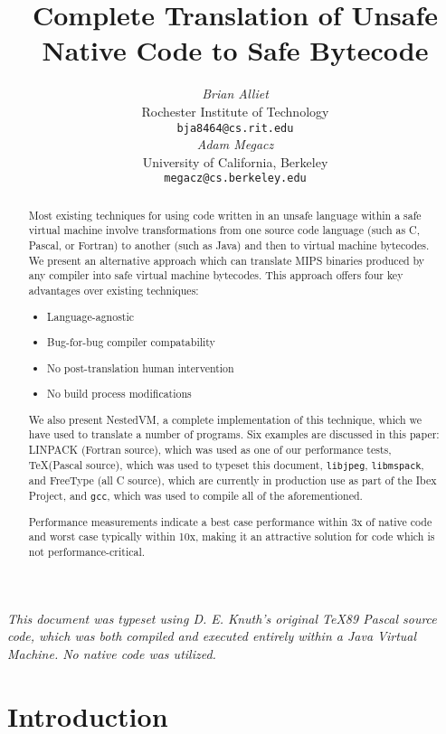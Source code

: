 \documentclass{acmconf}
\title{\textbf{\textsf{
Complete Translation of Unsafe Native Code to Safe Bytecode
}}}
\date{}
\author{\begin{tabular}{@{}c@{}}
        {\em {Brian Alliet}} \\
        {Rochester Institute of Technology}\\
        {\tt bja8464@cs.rit.edu}
   \end{tabular}\hskip 1in\begin{tabular}{@{}c@{}}
        {\em {Adam Megacz}} \\
        {University of California, Berkeley} \\
        {\tt megacz@cs.berkeley.edu}
\end{tabular}}
\begin{document}
\maketitle

{\it This document was typeset using D. E. Knuth's original \TeX 89
     Pascal source code, which was both compiled and executed entirely
     within a Java Virtual Machine.  No native code was utilized.}

\begin{abstract}

Most existing techniques for using code written in an unsafe language
within a safe virtual machine involve transformations from one source
code language (such as C, Pascal, or Fortran) to another (such as
Java) and then to virtual machine bytecodes.  We present an
alternative approach which can translate MIPS binaries produced by any
compiler into safe virtual machine bytecodes.  This approach offers
four key advantages over existing techniques:

\begin{itemize}
\item Language-agnostic
\item Bug-for-bug compiler compatability
\item No post-translation human intervention
\item No build process modifications
\end{itemize}

We also present NestedVM, a complete implementation of this technique,
which we have used to translate a number of programs.  Six examples
are discussed in this paper: LINPACK (Fortran source), which was used
as one of our performance tests, \TeX (Pascal source), which was used
to typeset this document, {\tt libjpeg}, {\tt libmspack}, and FreeType
(all C source), which are currently in production use as part of the
Ibex Project, and {\tt gcc}, which was used to compile all of the
aforementioned.

Performance measurements indicate a best case performance within 3x of
native code and worst case typically within 10x, making it an
attractive solution for code which is not performance-critical.

\end{abstract}

\section{Introduction}
\end{document}
